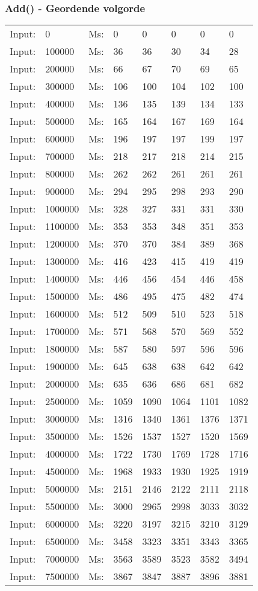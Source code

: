 \documentclass[11pt,a4paper]{report}
\begin{document}
\begin{tiny}
\subsubsection*{Add() - Geordende volgorde}
\begin{tabular}{l l ||l  l  l  l  l  l}
Input:&0&Ms:&0&0&0&0&0\\
Input:&100000&Ms:&36&36&30&34&28\\
Input:&200000&Ms:&66&67&70&69&65\\
Input:&300000&Ms:&106&100&104&102&100\\
Input:&400000&Ms:&136&135&139&134&133\\
Input:&500000&Ms:&165&164&167&169&164\\
Input:&600000&Ms:&196&197&197&199&197\\
Input:&700000&Ms:&218&217&218&214&215\\
Input:&800000&Ms:&262&262&261&261&261\\
Input:&900000&Ms:&294&295&298&293&290\\
Input:&1000000&Ms:&328&327&331&331&330\\
Input:&1100000&Ms:&353&353&348&351&353\\
Input:&1200000&Ms:&370&370&384&389&368\\
Input:&1300000&Ms:&416&423&415&419&419\\
Input:&1400000&Ms:&446&456&454&446&458\\
Input:&1500000&Ms:&486&495&475&482&474\\
Input:&1600000&Ms:&512&509&510&523&518\\
Input:&1700000&Ms:&571&568&570&569&552\\
Input:&1800000&Ms:&587&580&597&596&596\\
Input:&1900000&Ms:&645&638&638&642&642\\
Input:&2000000&Ms:&635&636&686&681&682\\
Input:&2500000&Ms:&1059&1090&1064&1101&1082\\
Input:&3000000&Ms:&1316&1340&1361&1376&1371\\
Input:&3500000&Ms:&1526&1537&1527&1520&1569\\
Input:&4000000&Ms:&1722&1730&1769&1728&1716\\
Input:&4500000&Ms:&1968&1933&1930&1925&1919\\
Input:&5000000&Ms:&2151&2146&2122&2111&2118\\
Input:&5500000&Ms:&3000&2965&2998&3033&3032\\
Input:&6000000&Ms:&3220&3197&3215&3210&3129\\
Input:&6500000&Ms:&3458&3323&3351&3343&3365\\
Input:&7000000&Ms:&3563&3589&3523&3582&3494\\
Input:&7500000&Ms:&3867&3847&3887&3896&3881\\
\end{tabular}


\end{tiny}
\end{document}

